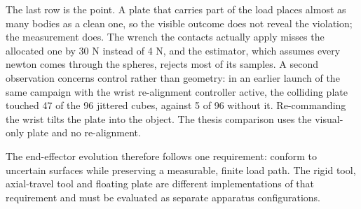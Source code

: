 The last row is the point. A plate that carries part of the load places almost as many bodies as a clean one, so the visible outcome does not reveal the violation; the measurement does. The wrench the contacts actually apply misses the allocated one by 30 N instead of 4 N, and the estimator, which assumes every newton comes through the spheres, rejects most of its samples. A second observation concerns control rather than geometry: in an earlier launch of the same campaign with the wrist re-alignment controller active, the colliding plate touched 47 of the 96 jittered cubes, against 5 of 96 without it. Re-commanding the wrist tilts the plate into the object. The thesis comparison uses the visual-only plate and no re-alignment.

The end-effector evolution therefore follows one requirement: conform to uncertain surfaces while preserving a measurable, finite load path. The rigid tool, axial-travel tool and floating plate are different implementations of that requirement and must be evaluated as separate apparatus configurations.

